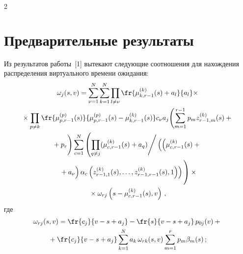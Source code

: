 \begin{multicols}{2}
\section{Предварительные результаты}

Из результатов работы~[1] вытекают следующие соотношения для нахождения распределения 
виртуального времени ожидания:
\begin{multline}
\label{3}
\omega_{j}(s,v)=
\sum\limits_{\nu=1}^N\sum\limits_{k=1}^N
\prod\limits_{l\ne \nu}\fr{\mu_{k,r-1}^{(k)}(s)+a_l}{a_l}\times\\
{}\times
\prod\limits_{p\ne k}\fr{\mu_{p,r-1}^{(p)}(s)}{\mu_{p,r-1}^{(p)}(s)-\mu_{k,r-1}^{(k)}(s)}
c_{\nu}a_j\!\left(\sum\limits_{m=1}^{r-1} p_mz_{r-1,m}^{(k)}(s)+{}\right.\\
\left.{}+ p_r
\vphantom{\sum\limits_{m=1}^{r-1}}
\right)
\sum\limits_{c=1}^N
\left(\prod\limits_{q\ne j}(\mu_{c,r-1}^{(k)}(s)+a_q)\Bigg /
\left(\left(\mu_{c,r-1}^{(k)}(s)+{}\right.\right.\right.\\
\left.\left.\left.{}+a_{\nu}\vphantom{\mu_{c,r-1}^{(k)}}\right)
\alpha_c\left(z_{r-1,1}^{(k)}(s),\ldots,z_{r-1,r-1}^{(k)}(s),1\right) \right)
\vphantom{\prod\limits_{q\ne j} \sum\limits_{c=1}^N}
\right)\times{}\\
{}\times 
\omega_{rj}\left(s-\mu_{c,r-1}^{(k)}(s),v\right)\,,
\end{multline}
где
\begin{multline}
\omega_{rj}(s,v)=\fr{c_j}{v-s+a_j}-\fr{s}{v-s+a_j}\, p_{0j}(v)+{}\\
{}+\fr{c_j}{v-s+a_j}
\sum\limits_{k=1}^N a_k\,\omega_{rk}(s,v)\sum\limits_{m=1}^rp_m\beta_m(s)\,;
\label{4}
\end{multline}

\vspace*{-12pt}


\end{multicols}
